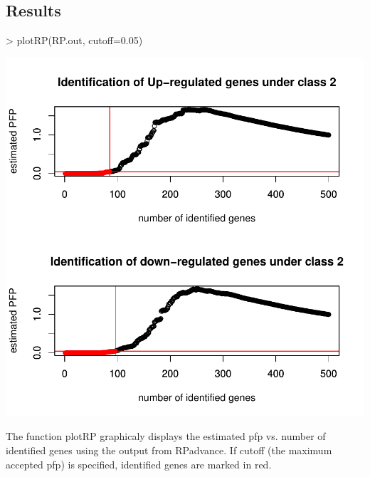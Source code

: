 \documentclass[a4paper]{report}
\begin{document}
\subsection*{Results}
\begin{center}
\begin{Schunk}
\begin{Sinput}
> plotRP(RP.out, cutoff=0.05)
\end{Sinput}
\end{Schunk}
\includegraphics{MAMA_full-035}
\end{center}
The function {\ttfamily plotRP} graphicaly displays the estimated pfp vs. number of identified genes using the output from {\ttfamily RPadvance}. If cutoff (the maximum accepted pfp) is specified, identified genes are marked in red.
\end{document}

